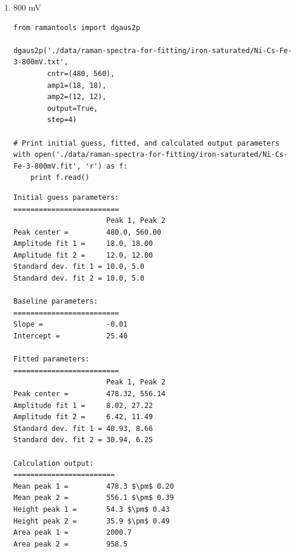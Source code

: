 \documentclass[journal=jpccck,manuscript=suppinfo,email=true]{achemso}
\begin{document}
\begin{enumerate}
\begin{enumerate}
\begin{enumerate}
\begin{verbatim}
Fitted parameters:
=========================
                      Peak 1, Peak 2
Peak center =         477.98, 556.32
Amplitude fit 1 =     6.62, 22.37
Amplitude fit 2 =     6.19, 7.79
Standard dev. fit 1 = 37.94, 8.63
Standard dev. fit 2 = 26.85, 6.80

Calculation output:
========================
Mean peak 1 =         478.0 $\pm$ 0.24
Mean peak 2 =         556.3 $\pm$ 0.56
Height peak 1 =       46.0 $\pm$ 0.42
Height peak 2 =       29.9 $\pm$ 0.47
Area peak 1 =         1575.0
Area peak 2 =         777.0
\end{verbatim}

\item 800 mV
\label{sec-4-2-0-2-3-3}
\begin{verbatim}
from ramantools import dgaus2p

dgaus2p('./data/raman-spectra-for-fitting/iron-saturated/Ni-Cs-Fe-3-800mV.txt',
        cntr=(480, 560),
        amp1=(18, 18),
        amp2=(12, 12),
        output=True,
        step=4)

# Print initial guess, fitted, and calculated output parameters
with open('./data/raman-spectra-for-fitting/iron-saturated/Ni-Cs-Fe-3-800mV.fit', 'r') as f:
    print f.read()
\end{verbatim}

\begin{verbatim}
Initial guess parameters:
=========================
                      Peak 1, Peak 2
Peak center =         480.0, 560.00
Amplitude fit 1 =     18.0, 18.00
Amplitude fit 2 =     12.0, 12.00
Standard dev. fit 1 = 10.0, 5.0
Standard dev. fit 2 = 10.0, 5.0

Baseline parameters:
=========================
Slope =               -0.01
Intercept =           25.40

Fitted parameters:
=========================
                      Peak 1, Peak 2
Peak center =         478.32, 556.14
Amplitude fit 1 =     8.02, 27.22
Amplitude fit 2 =     6.42, 11.49
Standard dev. fit 1 = 40.93, 8.66
Standard dev. fit 2 = 30.94, 6.25

Calculation output:
========================
Mean peak 1 =         478.3 $\pm$ 0.20
Mean peak 2 =         556.1 $\pm$ 0.39
Height peak 1 =       54.3 $\pm$ 0.43
Height peak 2 =       35.9 $\pm$ 0.49
Area peak 1 =         2000.7
Area peak 2 =         958.5
\end{verbatim}
\end{enumerate}
\end{enumerate}
\end{enumerate}
\end{document}
